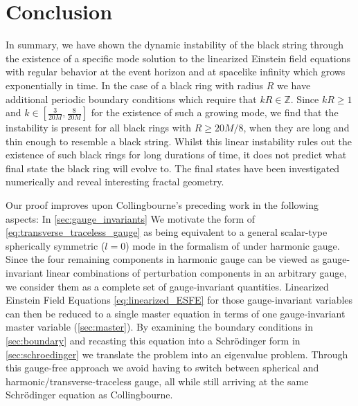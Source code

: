 \documentclass[11pt,aip,jmp,amsmath,amssymb,draft]{revtex4-1}
\begin{document}
\section{\label{sec:conclusion}Conclusion}
In summary, we have shown the dynamic instability of the black string through the existence of a specific mode solution to the linearized Einstein field equations with regular behavior at the event horizon and at spacelike infinity which grows exponentially in time. In the case of a black ring with radius $R$ we have additional periodic boundary conditions which require that $kR \in \mathbb{Z}$.
Since $kR \geq 1$ and $k\in [\frac{3}{20M}, \frac{8}{20M}]$ for the existence of such a growing mode, we find that the instability is present for all black rings with $R \geq 20M/8$, when they are long and thin enough to resemble a black string.
Whilst this linear instability rules out the existence of such black rings for long durations of time, it does not predict what final state the black ring will evolve to. The final states have been investigated numerically and reveal interesting fractal geometry\cite{lehner2012final}.

Our proof improves upon Collingbourne's preceding work in the following aspects: In \cref{sec:gauge_invariants} We motivate the form of \cref{eq:transverse_traceless_gauge} as being equivalent to a general scalar-type spherically symmetric ($l=0$) mode in the formalism of \cite{ishibashi2011perturbations} under harmonic gauge. Since the four remaining components in harmonic gauge can be viewed as gauge-invariant linear combinations of perturbation components in an arbitrary gauge, we consider them as a complete set of gauge-invariant quantities. Linearized Einstein Field Equations \cref{eq:linearized_ESFE} for those gauge-invariant variables can then be reduced to a single master equation in terms of one gauge-invariant master variable (\cref{sec:master}). By examining the boundary conditions in \cref{sec:boundary} and recasting this equation into a Schr{\"o}dinger form in \cref{sec:schroedinger} we translate the problem into an eigenvalue problem. Through this gauge-free approach we avoid having to switch between spherical and harmonic/transverse-traceless gauge, all while still arriving at the same Schr{\"o}dinger equation as Collingbourne.
 
\appendix
\end{document}
